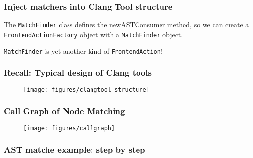 \documentclass[]{beamer}
\begin{document}
\begin{frame}
  \frametitle{Inject matchers into Clang Tool structure}
  The \texttt{MatchFinder} class defines the \alert{newASTConsumer} method,
  so we can create a \texttt{FrontendActionFactory} object with a \texttt{MatchFinder} object.
  
  \texttt{MatchFinder} is yet another kind of \texttt{FrontendAction}!
\end{frame}

\begin{frame}
  \frametitle{Recall: Typical design of Clang tools}
  \begin{figure}
    \texttt{[image: figures/clangtool-structure]}
  \end{figure}
\end{frame}

\begin{frame}
  \frametitle{Call Graph of Node Matching}
  \begin{figure}
    \texttt{[image: figures/callgraph]}
  \end{figure}
\end{frame}

\begin{frame}
  \frametitle{AST matche example: step by step}
  
\end{frame}


\end{document}
